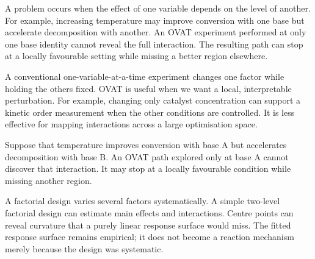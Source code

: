 A problem occurs when the effect of one variable depends on the level of another.
For example, increasing temperature may improve conversion with one base but accelerate decomposition with another.
An OVAT experiment performed at only one base identity cannot reveal the full interaction.
The resulting path can stop at a locally favourable setting while missing a better region elsewhere.



A conventional one-variable-at-a-time experiment changes one factor while holding the others fixed.
OVAT is useful when we want a local, interpretable perturbation.
For example, changing only catalyst concentration can support a kinetic order measurement when the other conditions are controlled.
It is less effective for mapping interactions across a large optimisation space.

Suppose that temperature improves conversion with base A but accelerates decomposition with base B.
An OVAT path explored only at base A cannot discover that interaction.
It may stop at a locally favourable condition while missing another region.

A factorial design varies several factors systematically.
A simple two-level factorial design can estimate main effects and interactions.
Centre points can reveal curvature that a purely linear response surface would miss.
The fitted response surface remains empirical; it does not become a reaction mechanism merely because the design was systematic.

